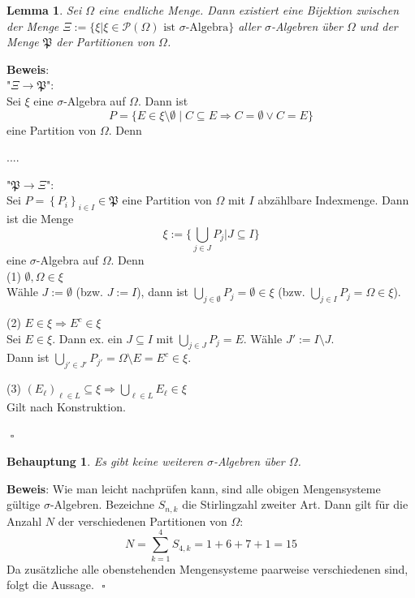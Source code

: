 \documentclass[11pt,a4paper,ngerman]{article}
\newcommand{\set}[1]{ \{ #1 \}}
\newtheorem{prop}{\bfseries Behauptung}
\newtheorem{lemma}{\bfseries Lemma}
\begin{document}
\begin{lemma}
Sei $\Omega$ eine endliche Menge. Dann existiert eine Bijektion zwischen der Menge $\Xi := \set{\xi | \xi \in \mathcal{P}(\Omega) \text{ ist $\sigma$-Algebra}}$ aller $\sigma$-Algebren über $\Omega$ und der Menge $\mathfrak{P}$  der Partitionen von $\Omega$.	
\end{lemma}

\textbf{Beweis}: \\
"$\Xi \to \mathfrak{P}$": \\
Sei $\xi$ eine $\sigma$-Algebra auf $\Omega$. Dann ist 
\begin{equation*}P = \{ E \in \xi \setminus \emptyset \; | \; C \subseteq E \Rightarrow C = \emptyset \lor C = E  \} \end{equation*}
eine Partition von $\Omega$. Denn

....

"$\mathfrak{P} \to \Xi$": \\
Sei $P = \left\{ P_i \right\}_{i \in I} \in \mathfrak{P}$ eine Partition von $\Omega$ mit $I$ abzählbare Indexmenge. Dann ist die Menge
\begin{equation*}\xi := \{ \bigcup_{j \in J} P_j | J \subseteq I \} \end{equation*}
eine $\sigma$-Algebra auf $\Omega$. Denn\\

(1) $\emptyset, \Omega \in \xi$ \\
Wähle $J := \emptyset$ (bzw. $J := I$), dann ist $\bigcup_{j \in \emptyset} P_j = \emptyset \in \xi$ (bzw. $\bigcup_{j \in I} P_j = \Omega \in \xi$).

(2) $E \in \xi \Rightarrow E^c \in \xi$ \\
Sei $E \in \xi$. Dann ex. ein $J \subseteq I$ mit $\bigcup_{j \in J} P_j = E$. Wähle $J' := I \setminus J$.\\
Dann ist $\bigcup_{j' \in J'} P_{j'} = \Omega \setminus E = E^c \in \xi$.

(3) $\left( E_\ell \right)_{\ell \in L} \subseteq \xi \Rightarrow \bigcup_{\ell \in L} E_\ell \in \xi$ \\
Gilt nach Konstruktion.


 $\mbox{}$ \hfill $\square$

\begin{prop}
 Es gibt keine weiteren $\sigma$-Algebren über $\Omega$. 
\end{prop}
\textbf{Beweis}: Wie man leicht nachprüfen kann, sind alle obigen Mengensysteme gültige $\sigma$-Algebren. Bezeichne $S_{n,k}$ die Stirlingzahl zweiter Art.
Dann gilt für die Anzahl $N$ der verschiedenen Partitionen von $\Omega$: 
\begin{equation}
N = \sum_{k=1}^4 S_{4,k} = 1 +6+ 7+ 1=15
\end{equation}
Da zusätzliche alle obenstehenden Mengensysteme paarweise verschiedenen sind, folgt die Aussage.
$\mbox{}$ \hfill $\square$
\end{document}
